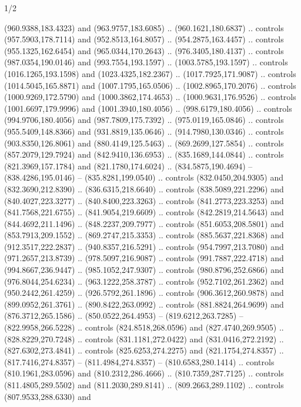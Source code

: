 \begin{flagdescription}{1/2}
\begin{scope}[shift={(2*\flaglength/3-0.25*\rb,0.51333\flagwidth)},scale=0.001715\flagwidth*\stretchfactor]
\begin{scope}[y=-1pt, x=1pt,cm={{1.04354,0.0,0.0,1.01818,(-827,-297)}}]
\begin{scope}[fill=gold]
  (960.9388,183.4323) and (963.9757,183.6085) .. (960.1621,180.6837) .. controls
  (957.5903,178.7114) and (952.8513,164.8057) .. (954.2875,163.4457) .. controls
  (955.1325,162.6454) and (965.0344,170.2643) .. (976.3405,180.4137) .. controls
  (987.0354,190.0146) and (993.7554,193.1597) .. (1003.5785,193.1597) ..
  controls (1016.1265,193.1598) and (1023.4325,182.2367) .. (1017.7925,171.9087)
  .. controls (1014.5045,165.8871) and (1007.1795,165.0506) ..
  (1002.8965,170.2076) .. controls (1000.9269,172.5790) and (1000.3862,174.4653)
  .. (1000.9631,176.9526) .. controls (1001.6697,179.9996) and
  (1001.3940,180.4056) .. (998.6179,180.4056) .. controls (994.9706,180.4056)
  and (987.7809,175.7392) .. (975.0119,165.0846) .. controls (955.5409,148.8366)
  and (931.8819,135.0646) .. (914.7980,130.0346) .. controls (903.8350,126.8061)
  and (880.4149,125.5463) .. (869.2699,127.5854) .. controls (857.2079,129.7924)
  and (842.9410,136.6953) .. (835.1689,144.0844) .. controls (821.3969,157.1784)
  and (821.1780,174.6024) .. (834.5875,190.4694) -- (838.4286,195.0146) --
  (835.8281,199.0540) .. controls (832.0450,204.9305) and (832.3690,212.8390) ..
  (836.6315,218.6640) .. controls (838.5089,221.2296) and (840.4027,223.3277) ..
  (840.8400,223.3263) .. controls (841.2773,223.3253) and (841.7568,221.6755) ..
  (841.9054,219.6609) .. controls (842.2819,214.5643) and (844.4692,211.1496) ..
  (848.2237,209.7977) .. controls (851.6053,208.5801) and (853.7913,209.1552) ..
  (869.2747,215.3353) .. controls (885.5637,221.8368) and (912.3517,222.2837) ..
  (940.8357,216.5291) .. controls (954.7997,213.7080) and (971.2657,213.8739) ..
  (978.5097,216.9087) .. controls (991.7887,222.4718) and (994.8667,236.9447) ..
  (985.1052,247.9307) .. controls (980.8796,252.6866) and (976.8044,254.6234) ..
  (963.1222,258.3787) .. controls (952.7102,261.2362) and (950.2442,261.4259) ..
  (926.5792,261.1896) .. controls (906.3612,260.9878) and (899.0952,261.3761) ..
  (890.8422,263.0992) .. controls (881.8824,264.9699) and (876.3712,265.1586) ..
  (850.0522,264.4953) -- (819.6212,263.7285) -- (822.9958,266.5228) .. controls
  (824.8518,268.0596) and (827.4740,269.9505) .. (828.8229,270.7248) .. controls
  (831.1181,272.0422) and (831.0416,272.2192) .. (827.6302,273.4841) .. controls
  (825.6253,274.2275) and (821.1754,274.8357) .. (817.7416,274.8357) --
  (811.4984,274.8357) -- (810.6583,280.1414) .. controls (810.1961,283.0596) and
  (810.2312,286.4666) .. (810.7359,287.7125) .. controls (811.4805,289.5502) and
  (811.2030,289.8141) .. (809.2663,289.1102) .. controls (807.9533,288.6330) and

\end{scope}
\end{scope}
\end{scope}
\end{flagdescription}
